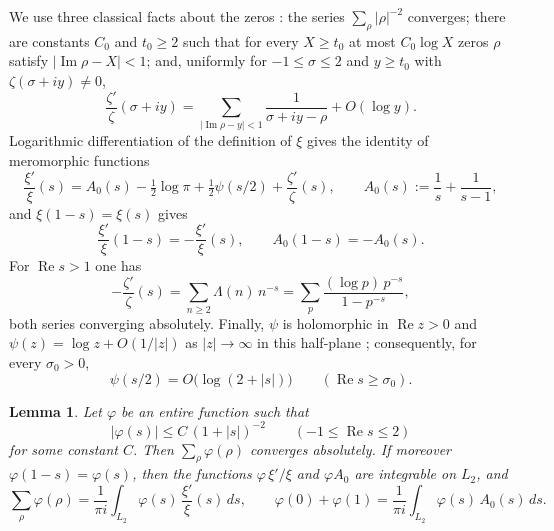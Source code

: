 \documentclass[11pt]{amsart}
\newtheorem{lemma}[theorem]{Lemma}
\theoremstyle{remark}
\numberwithin{equation}{section}
\newcommand{\Rel}{\operatorname{Re}}
\newcommand{\Iml}{\operatorname{Im}}
\begin{document}
We use three classical facts about the zeros \cite[ch.~12 and~15]{Davenport}:
the series $\sum_\rho|\rho|^{-2}$ converges; there are constants $C_0$ and
$t_0\ge2$ such that for every $X\ge t_0$ at most $C_0\log X$ zeros $\rho$
satisfy $|\Iml\rho-X|<1$; and, uniformly for $-1\le\sigma\le2$ and
$y\ge t_0$ with $\zeta(\sigma+iy)\ne0$,
\begin{equation}
\label{eq:partialfractions}
  \frac{\zeta'}{\zeta}(\sigma+iy)
  =\sum_{|\Iml\rho-y|<1}\frac1{\sigma+iy-\rho}+O(\log y).
\end{equation}
Logarithmic differentiation of the definition of $\xi$ gives the identity of
meromorphic functions
\begin{equation}
\label{eq:xilog}
  \frac{\xi'}{\xi}(s)=A_0(s)-\tfrac12\log\pi+\tfrac12\psi(s/2)
   +\frac{\zeta'}{\zeta}(s),
  \qquad A_0(s):=\frac1s+\frac1{s-1},
\end{equation}
and $\xi(1-s)=\xi(s)$ gives
\begin{equation}
\label{eq:xireflect}
  \frac{\xi'}{\xi}(1-s)=-\frac{\xi'}{\xi}(s),\qquad A_0(1-s)=-A_0(s).
\end{equation}
For $\Rel s>1$ one has
\begin{equation}
\label{eq:euler}
  -\frac{\zeta'}{\zeta}(s)=\sum_{n\ge2}\Lambda(n)\,n^{-s}
  =\sum_p\frac{(\log p)\,p^{-s}}{1-p^{-s}},
\end{equation}
both series converging absolutely.  Finally, $\psi$ is holomorphic in
$\Rel z>0$ and $\psi(z)=\log z+O(1/|z|)$ as $|z|\to\infty$ in this
half-plane \cite[\S5.11]{NIST}; consequently, for every $\sigma_0>0$,
\begin{equation}
\label{eq:psibound}
  \psi(s/2)=O\bigl(\log(2+|s|)\bigr)\qquad(\Rel s\ge\sigma_0).
\end{equation}

\begin{lemma}
\label{lem:contour}
Let $\varphi$ be an entire function such that
\begin{equation}
\label{eq:gdecay}
  |\varphi(s)|\le C\,(1+|s|)^{-2}\qquad(-1\le\Rel s\le2)
\end{equation}
for some constant $C$.  Then $\sum_\rho \varphi(\rho)$ converges absolutely.  If
moreover $\varphi(1-s)=\varphi(s)$, then the
functions $\varphi \,\xi'/\xi$ and $\varphi A_0$ are integrable on $L_2$, and
\begin{equation}
\label{eq:zeroint}
  \sum_\rho \varphi(\rho)=\frac1{\pi i}\int_{L_2}\varphi(s)\,\frac{\xi'}{\xi}(s)\,ds ,
  \qquad
  \varphi(0)+\varphi(1)=\frac1{\pi i}\int_{L_2}\varphi(s)\,A_0(s)\,ds .
\end{equation}
\end{lemma}
\end{document}
